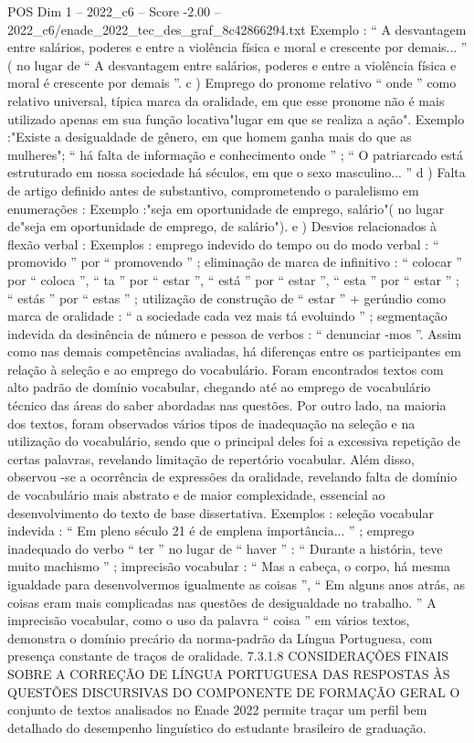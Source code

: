 \begin{textsample}{POS Dim 1 – 2022\_c6 – Score -2.00 – 2022\_c6/enade\_2022\_tec\_des\_graf\_8c42866294.txt}
Exemplo : “ A desvantagem entre salários, poderes e entre a violência física e moral e crescente por demais... ” ( no lugar de “ A desvantagem entre salários, poderes e entre a violência física e moral é crescente por demais ”. c ) Emprego do pronome relativo “ onde ” como relativo universal, típica marca da oralidade, em que esse pronome não é mais utilizado apenas em sua função locativa"lugar em que se realiza a ação".
Exemplo :"Existe a desigualdade de gênero, em que homem ganha mais do que as mulheres"; “ há falta de informação e conhecimento onde ” ; “ O patriarcado está estruturado em nossa sociedade há séculos, em que o sexo masculino... ” d ) Falta de artigo definido antes de substantivo, comprometendo o paralelismo em enumerações : Exemplo :"seja em oportunidade de emprego, salário"( no lugar de"seja em oportunidade de emprego, de salário"). e ) Desvios relacionados à flexão verbal : Exemplos : emprego indevido do tempo ou do modo verbal : “ promovido ” por “ promovendo ” ; eliminação de marca de infinitivo : “ colocar ” por “ coloca ”, “ ta ” por “ estar ”, “ está ” por “ estar ”, “ esta ” por “ estar ” ; “ estás ” por “ estas ” ; utilização de construção de “ estar ” + gerúndio como marca de oralidade : “ a sociedade cada vez mais tá evoluindo ” ; segmentação indevida da desinência de número e pessoa de verbos : “ denunciar -mos ”.
Assim como nas demais competências avaliadas, há diferenças entre os participantes em relação à seleção e ao emprego do vocabulário.
Foram encontrados textos com alto padrão de domínio vocabular, chegando até ao emprego de vocabulário técnico das áreas do saber abordadas nas questões.
Por outro lado, na maioria dos textos, foram observados vários tipos de inadequação na seleção e na utilização do vocabulário, sendo que o principal deles foi a excessiva repetição de certas palavras, revelando limitação de repertório vocabular.
Além disso, observou -se a ocorrência de expressões da oralidade, revelando falta de domínio de vocabulário mais abstrato e de maior complexidade, essencial ao desenvolvimento do texto de base dissertativa.
Exemplos : seleção vocabular indevida : “ Em pleno século 21 é de emplena importância... ” ; emprego inadequado do verbo “ ter ” no lugar de “ haver ” : “ Durante a história, teve muito machismo ” ; imprecisão vocabular : “ Mas a cabeça, o corpo, há mesma igualdade para desenvolvermos igualmente as coisas ”, “ Em alguns anos atrás, as coisas eram mais complicadas nas questões de desigualdade no trabalho. ” A imprecisão vocabular, como o uso da palavra “ coisa ” em vários textos, demonstra o domínio precário da norma-padrão da Língua Portuguesa, com presença constante de traços de oralidade. 7.3.1.8 CONSIDERAÇÕES FINAIS SOBRE A CORREÇÃO DE LÍNGUA PORTUGUESA DAS RESPOSTAS ÀS QUESTÕES DISCURSIVAS DO COMPONENTE DE FORMAÇÃO GERAL O conjunto de textos analisados no Enade 2022 permite traçar um perfil bem detalhado do desempenho linguístico do estudante brasileiro de graduação.

\end{textsample}
